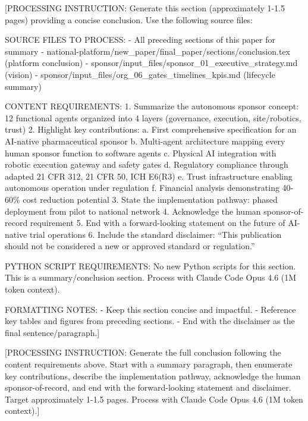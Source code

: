
[PROCESSING INSTRUCTION: Generate this section (approximately 1-1.5 pages) providing a
concise conclusion. Use the following source files:

SOURCE FILES TO PROCESS:
- All preceding sections of this paper for summary
- national-platform/new\_paper/final\_paper/sections/conclusion.tex (platform conclusion)
- sponsor/input\_files/sponsor\_01\_executive\_strategy.md (vision)
- sponsor/input\_files/org\_06\_gates\_timelines\_kpis.md (lifecycle summary)

CONTENT REQUIREMENTS:
1. Summarize the autonomous sponsor concept: 12 functional agents organized into
   4 layers (governance, execution, site/robotics, trust)
2. Highlight key contributions:
   a. First comprehensive specification for an AI-native pharmaceutical sponsor
   b. Multi-agent architecture mapping every human sponsor function to software agents
   c. Physical AI integration with robotic execution gateway and safety gates
   d. Regulatory compliance through adapted 21 CFR 312, 21 CFR 50, ICH E6(R3)
   e. Trust infrastructure enabling autonomous operation under regulation
   f. Financial analysis demonstrating 40-60\% cost reduction potential
3. State the implementation pathway: phased deployment from pilot to national network
4. Acknowledge the human sponsor-of-record requirement
5. End with a forward-looking statement on the future of AI-native trial operations
6. Include the standard disclaimer: ``This publication should not be considered a new
   or approved standard or regulation.''

PYTHON SCRIPT REQUIREMENTS: No new Python scripts for this section.
This is a summary/conclusion section. Process with Claude Code Opus 4.6 (1M token context).

FORMATTING NOTES:
- Keep this section concise and impactful.
- Reference key tables and figures from preceding sections.
- End with the disclaimer as the final sentence/paragraph.]

[PROCESSING INSTRUCTION: Generate the full conclusion following the content requirements
above. Start with a summary paragraph, then enumerate key contributions, describe the
implementation pathway, acknowledge the human sponsor-of-record, and end with the
forward-looking statement and disclaimer. Target approximately 1-1.5 pages.
Process with Claude Code Opus 4.6 (1M token context).]
